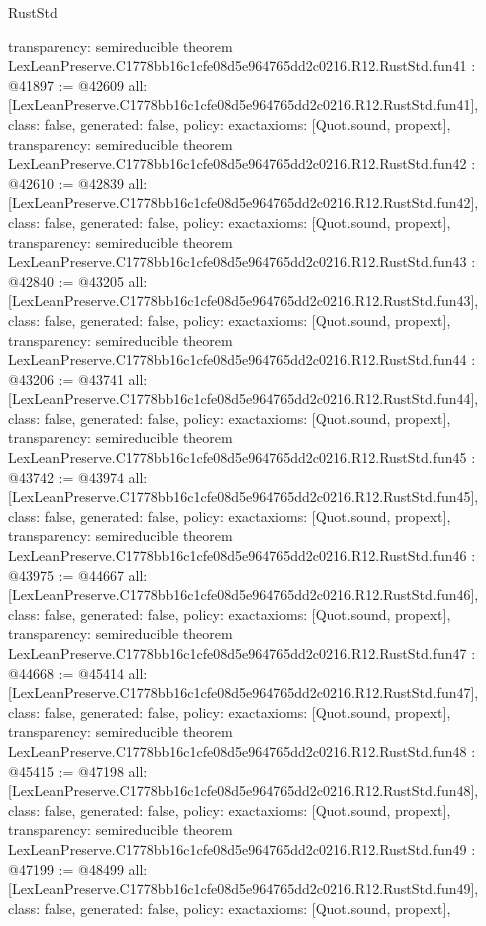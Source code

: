 \begin{lexlean}{RustStd}
\begin{coremodule}
{  transparency: semireducible
}
theorem LexLeanPreserve.C1778bb16c1cfe08d5e964765dd2c0216.R12.RustStd.fun41 : @41897 := @42609 {
  all: [LexLeanPreserve.C1778bb16c1cfe08d5e964765dd2c0216.R12.RustStd.fun41],
  class: false,
  generated: false,
  policy: exact{axioms: [Quot.sound, propext]},
  transparency: semireducible
}
theorem LexLeanPreserve.C1778bb16c1cfe08d5e964765dd2c0216.R12.RustStd.fun42 : @42610 := @42839 {
  all: [LexLeanPreserve.C1778bb16c1cfe08d5e964765dd2c0216.R12.RustStd.fun42],
  class: false,
  generated: false,
  policy: exact{axioms: [Quot.sound, propext]},
  transparency: semireducible
}
theorem LexLeanPreserve.C1778bb16c1cfe08d5e964765dd2c0216.R12.RustStd.fun43 : @42840 := @43205 {
  all: [LexLeanPreserve.C1778bb16c1cfe08d5e964765dd2c0216.R12.RustStd.fun43],
  class: false,
  generated: false,
  policy: exact{axioms: [Quot.sound, propext]},
  transparency: semireducible
}
theorem LexLeanPreserve.C1778bb16c1cfe08d5e964765dd2c0216.R12.RustStd.fun44 : @43206 := @43741 {
  all: [LexLeanPreserve.C1778bb16c1cfe08d5e964765dd2c0216.R12.RustStd.fun44],
  class: false,
  generated: false,
  policy: exact{axioms: [Quot.sound, propext]},
  transparency: semireducible
}
theorem LexLeanPreserve.C1778bb16c1cfe08d5e964765dd2c0216.R12.RustStd.fun45 : @43742 := @43974 {
  all: [LexLeanPreserve.C1778bb16c1cfe08d5e964765dd2c0216.R12.RustStd.fun45],
  class: false,
  generated: false,
  policy: exact{axioms: [Quot.sound, propext]},
  transparency: semireducible
}
theorem LexLeanPreserve.C1778bb16c1cfe08d5e964765dd2c0216.R12.RustStd.fun46 : @43975 := @44667 {
  all: [LexLeanPreserve.C1778bb16c1cfe08d5e964765dd2c0216.R12.RustStd.fun46],
  class: false,
  generated: false,
  policy: exact{axioms: [Quot.sound, propext]},
  transparency: semireducible
}
theorem LexLeanPreserve.C1778bb16c1cfe08d5e964765dd2c0216.R12.RustStd.fun47 : @44668 := @45414 {
  all: [LexLeanPreserve.C1778bb16c1cfe08d5e964765dd2c0216.R12.RustStd.fun47],
  class: false,
  generated: false,
  policy: exact{axioms: [Quot.sound, propext]},
  transparency: semireducible
}
theorem LexLeanPreserve.C1778bb16c1cfe08d5e964765dd2c0216.R12.RustStd.fun48 : @45415 := @47198 {
  all: [LexLeanPreserve.C1778bb16c1cfe08d5e964765dd2c0216.R12.RustStd.fun48],
  class: false,
  generated: false,
  policy: exact{axioms: [Quot.sound, propext]},
  transparency: semireducible
}
theorem LexLeanPreserve.C1778bb16c1cfe08d5e964765dd2c0216.R12.RustStd.fun49 : @47199 := @48499 {
  all: [LexLeanPreserve.C1778bb16c1cfe08d5e964765dd2c0216.R12.RustStd.fun49],
  class: false,
  generated: false,
  policy: exact{axioms: [Quot.sound, propext]},
}
\end{coremodule}
\end{lexlean}
